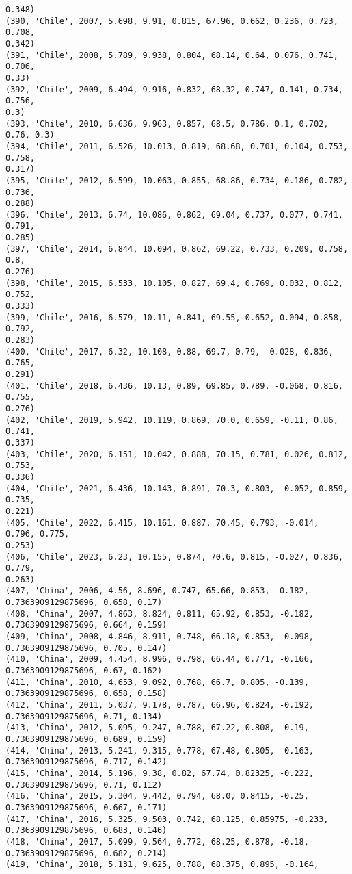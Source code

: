 \documentclass[11pt]{article}
\begin{document}
\begin{Verbatim}[commandchars=\\\{\}]
0.348)
(390, 'Chile', 2007, 5.698, 9.91, 0.815, 67.96, 0.662, 0.236, 0.723, 0.708,
0.342)
(391, 'Chile', 2008, 5.789, 9.938, 0.804, 68.14, 0.64, 0.076, 0.741, 0.706,
0.33)
(392, 'Chile', 2009, 6.494, 9.916, 0.832, 68.32, 0.747, 0.141, 0.734, 0.756,
0.3)
(393, 'Chile', 2010, 6.636, 9.963, 0.857, 68.5, 0.786, 0.1, 0.702, 0.76, 0.3)
(394, 'Chile', 2011, 6.526, 10.013, 0.819, 68.68, 0.701, 0.104, 0.753, 0.758,
0.317)
(395, 'Chile', 2012, 6.599, 10.063, 0.855, 68.86, 0.734, 0.186, 0.782, 0.736,
0.288)
(396, 'Chile', 2013, 6.74, 10.086, 0.862, 69.04, 0.737, 0.077, 0.741, 0.791,
0.285)
(397, 'Chile', 2014, 6.844, 10.094, 0.862, 69.22, 0.733, 0.209, 0.758, 0.8,
0.276)
(398, 'Chile', 2015, 6.533, 10.105, 0.827, 69.4, 0.769, 0.032, 0.812, 0.752,
0.333)
(399, 'Chile', 2016, 6.579, 10.11, 0.841, 69.55, 0.652, 0.094, 0.858, 0.792,
0.283)
(400, 'Chile', 2017, 6.32, 10.108, 0.88, 69.7, 0.79, -0.028, 0.836, 0.765,
0.291)
(401, 'Chile', 2018, 6.436, 10.13, 0.89, 69.85, 0.789, -0.068, 0.816, 0.755,
0.276)
(402, 'Chile', 2019, 5.942, 10.119, 0.869, 70.0, 0.659, -0.11, 0.86, 0.741,
0.337)
(403, 'Chile', 2020, 6.151, 10.042, 0.888, 70.15, 0.781, 0.026, 0.812, 0.753,
0.336)
(404, 'Chile', 2021, 6.436, 10.143, 0.891, 70.3, 0.803, -0.052, 0.859, 0.735,
0.221)
(405, 'Chile', 2022, 6.415, 10.161, 0.887, 70.45, 0.793, -0.014, 0.796, 0.775,
0.253)
(406, 'Chile', 2023, 6.23, 10.155, 0.874, 70.6, 0.815, -0.027, 0.836, 0.779,
0.263)
(407, 'China', 2006, 4.56, 8.696, 0.747, 65.66, 0.853, -0.182,
0.7363909129875696, 0.658, 0.17)
(408, 'China', 2007, 4.863, 8.824, 0.811, 65.92, 0.853, -0.182,
0.7363909129875696, 0.664, 0.159)
(409, 'China', 2008, 4.846, 8.911, 0.748, 66.18, 0.853, -0.098,
0.7363909129875696, 0.705, 0.147)
(410, 'China', 2009, 4.454, 8.996, 0.798, 66.44, 0.771, -0.166,
0.7363909129875696, 0.67, 0.162)
(411, 'China', 2010, 4.653, 9.092, 0.768, 66.7, 0.805, -0.139,
0.7363909129875696, 0.658, 0.158)
(412, 'China', 2011, 5.037, 9.178, 0.787, 66.96, 0.824, -0.192,
0.7363909129875696, 0.71, 0.134)
(413, 'China', 2012, 5.095, 9.247, 0.788, 67.22, 0.808, -0.19,
0.7363909129875696, 0.689, 0.159)
(414, 'China', 2013, 5.241, 9.315, 0.778, 67.48, 0.805, -0.163,
0.7363909129875696, 0.717, 0.142)
(415, 'China', 2014, 5.196, 9.38, 0.82, 67.74, 0.82325, -0.222,
0.7363909129875696, 0.71, 0.112)
(416, 'China', 2015, 5.304, 9.442, 0.794, 68.0, 0.8415, -0.25,
0.7363909129875696, 0.667, 0.171)
(417, 'China', 2016, 5.325, 9.503, 0.742, 68.125, 0.85975, -0.233,
0.7363909129875696, 0.683, 0.146)
(418, 'China', 2017, 5.099, 9.564, 0.772, 68.25, 0.878, -0.18,
0.7363909129875696, 0.682, 0.214)
(419, 'China', 2018, 5.131, 9.625, 0.788, 68.375, 0.895, -0.164,

\end{Verbatim}
\end{document}
